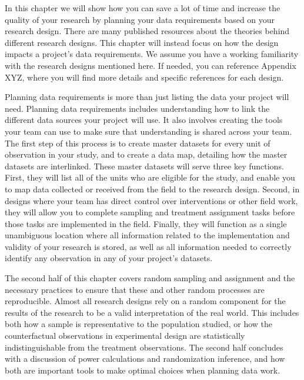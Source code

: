 
\begin{fullwidth}

In this chapter we will show how you can save a lot of time
and increase the quality of your research by planning your data requirements
based on your research design.
There are many published resources about 
the theories behind different research designs.
This chapter will instead focus on how the design 
impacts a project's data requirements.
We assume you have a working familiarity
with the research designs mentioned here.
If needed, you can reference Appendix XYZ,
where you will find more details 
and specific references for each design.

Planning data requirements is more than just listing the data your project will need. 
Planning data requirements includes understanding how to
link the different data sources your project will use.
It also involves creating the tools your team can use
to make sure that understanding is shared across your team.
The first step of this process is to create master datasets 
for every unit of observation in your study,
and to create a data map, 
detailing how the master datasets are interlinked.
These master datasets will serve three key functions.
First, they will list all of the units who are eligible for the study,
and enable you to map data collected or received from the field to the research design.
Second, in designs where your team has direct control over interventions or other field work,
they will allow you to complete sampling and treatment assignment tasks
before those tasks are implemented in the field.
Finally, they will function as a single unambiguous location where all information 
related to the implementation and validity of your research is stored,
as well as all information needed to correctly identify any observation in any of your project's datasets.

The second half of this chapter covers random sampling and assignment
and the necessary practices to ensure that 
these and other random processes are reproducible.
Almost all research designs rely on a random component 
for the results of the research to be a valid interpretation of the real world.
This includes both how a sample is representative to the population studied,
or how the counterfactual observations in experimental design are statistically indistinguishable
from the treatment observations.
The second half concludes with a discussion of power calculations and randomization inference,
and how both are important tools to make optimal choices when planning data work.


\end{fullwidth}

